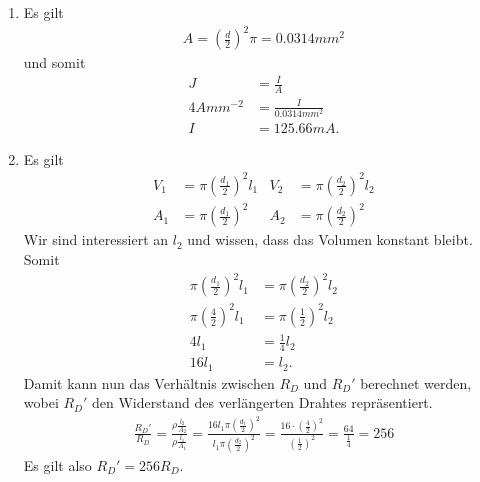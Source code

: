 \documentclass{article}
\begin{document}
\begin{enumerate}
    \item Es gilt
    \begin{align*}
        A = \left(\frac{d}{2}\right)^2 \pi = 0.0314mm^2
    \end{align*}
    und somit
    \begin{align*}
        J &= \frac{I}{A} \\
        4 Amm^{-2} &= \frac{I}{0.0314mm^2} \\
        I &= 125.66mA.
    \end{align*}

    \item Es gilt
    \begin{align*}
        V_1 &= \pi \left(\frac{d_1}{2}\right)^2 l_1 & V_2 &= \pi \left(\frac{d_2}{2}\right)^2 l_2 \\
        A_1 &= \pi \left(\frac{d_1}{2}\right)^2 & A_2 &= \pi \left(\frac{d_2}{2}\right)^2
    \end{align*}
    Wir sind interessiert an $l_2$ und wissen, dass das Volumen konstant bleibt. Somit
    \begin{align*}
        \pi \left(\frac{d_1}{2}\right)^2 l_1 &= \pi \left(\frac{d_2}{2}\right)^2 l_2 \\
        \pi \left(\frac{4}{2}\right)^2 l_1 &= \pi \left(\frac{1}{2}\right)^2 l_2 \\
        4l_1 &= \frac{1}{4}l_2 \\
        16l_1 &= l_2.
    \end{align*}
    Damit kann nun das Verh\"altnis zwischen $R_D$ und $R_D'$ berechnet werden, wobei $R_D'$ den Widerstand des verl\"angerten Drahtes repr\"asentiert.
    \begin{align*}
        \frac{R_D'}{R_D} = 
        \frac{\rho \frac{l_2}{A_2}}{\rho \frac{l_1}{A_1}} = 
        \frac{16l_1 \pi \left(\frac{d_1}{2}\right)^2}{l_1\pi \left(\frac{d_2}{2}\right)^2} =
        \frac{16 \cdot \left(\frac{4}{2}\right)^2}{\left(\frac{1}{2}\right)^2} =
        \frac{64}{\frac{1}{4}} =
        256
    \end{align*}
    Es gilt also $R_D' = 256R_D$.
\end{enumerate}
\end{document}
